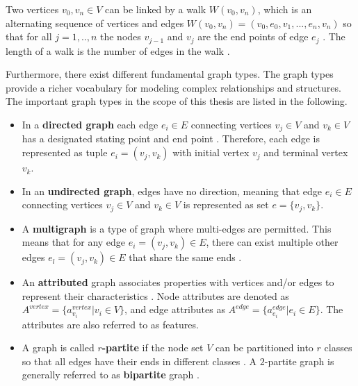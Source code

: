 Two vertices $v_0, v_n \in V$ can be linked by a walk $W(v_0, v_n)$, which is an alternating sequence of vertices and edges $W(v_0, v_n)=(v_0, e_0, v_1, ..., e_n, v_n)$ so that for all $j=1,..,n$ the nodes $v_{j-1}$ and $v_j$ are the end points of edge $e_j$ \cite{diestel_graph_2017}. The length of a walk is the number of edges in the walk \cite{diestel_graph_2017}.

Furthermore, there exist different fundamental graph types. The graph types provide a richer vocabulary for modeling complex relationships and structures. The important graph types in the scope of this thesis are listed in the following.

\begin{itemize}
    \item In a \textbf{directed graph} each edge $e_i \in E$ connecting vertices $v_j \in V$ and $v_k \in V$ has a designated stating point and end point \cite{diestel_graph_2017}. Therefore, each edge is represented as tuple $e_i = (v_j, v_k)$ with initial vertex $v_j$ and terminal vertex $v_k$. 
    
    \item In an \textbf{undirected graph}, edges have no direction, meaning that edge $e_i \in E$ connecting vertices $v_j \in V$ and $v_k \in V$ is represented as set $e = \{v_j, v_k\}$.
    
    \item A \textbf{multigraph} is a type of graph where multi-edges are permitted. This means that for any edge $e_i = (v_j,v_k) \in E$, there can exist multiple other edges $e_l = (v_j,v_k) \in E$ that share the same ends \cite{kazemi_representation_2019}.
    
    \item An \textbf{attributed} graph associates properties with vertices and/or edges to represent their characteristics \cite{kazemi_representation_2019}. Node attributes are denoted as $A^{vertex} = \{a^{vertex}_{v_i} | v_i \in V\}$, and edge attributes as $A^{edge} = \{a^{edge}_{e_i} | e_i \in E\}$. The attributes are also referred to as features.
    
    \item A graph is called \textbf{$r$-partite} if the node set $V$ can be partitioned into $r$ classes so that all edges have their ends in different classes \cite{diestel_graph_2017}. A $2$-partite graph is generally referred to as \textbf{bipartite} graph \cite{diestel_graph_2017}.
\end{itemize}


